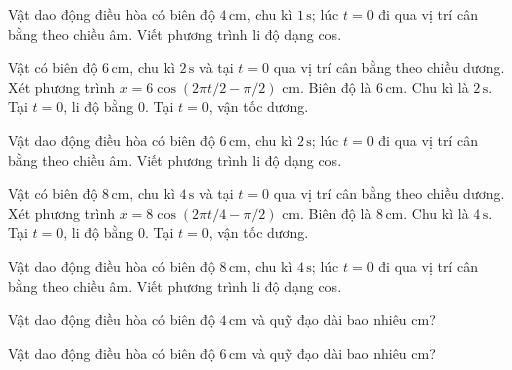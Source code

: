 \begin{bt}
Vật dao động điều hòa có biên độ $4\,\text{cm}$, chu kì $1\,\text{s}$; lúc $t=0$ đi qua vị trí cân bằng theo chiều âm. Viết phương trình li độ dạng cos.
\end{bt}

\begin{ex}
Vật có biên độ $6\,\text{cm}$, chu kì $2\,\text{s}$ và tại $t=0$ qua vị trí cân bằng theo chiều dương. Xét phương trình $x=6\cos(2\pi t/2-\pi/2)$ cm.
\choiceTF
{\True Biên độ là $6\,\text{cm}$.}
{\True Chu kì là $2\,\text{s}$.}
{\True Tại $t=0$, li độ bằng 0.}
{\True Tại $t=0$, vận tốc dương.}
\end{ex}

\begin{bt}
Vật dao động điều hòa có biên độ $6\,\text{cm}$, chu kì $2\,\text{s}$; lúc $t=0$ đi qua vị trí cân bằng theo chiều âm. Viết phương trình li độ dạng cos.
\end{bt}

\begin{ex}
Vật có biên độ $8\,\text{cm}$, chu kì $4\,\text{s}$ và tại $t=0$ qua vị trí cân bằng theo chiều dương. Xét phương trình $x=8\cos(2\pi t/4-\pi/2)$ cm.
\choiceTF
{\True Biên độ là $8\,\text{cm}$.}
{\True Chu kì là $4\,\text{s}$.}
{\True Tại $t=0$, li độ bằng 0.}
{\True Tại $t=0$, vận tốc dương.}
\end{ex}

\begin{bt}
Vật dao động điều hòa có biên độ $8\,\text{cm}$, chu kì $4\,\text{s}$; lúc $t=0$ đi qua vị trí cân bằng theo chiều âm. Viết phương trình li độ dạng cos.
\end{bt}

\begin{ex}
Vật dao động điều hòa có biên độ $4\,\text{cm}$ và quỹ đạo dài bao nhiêu cm?
\end{ex}

\begin{ex}
Vật dao động điều hòa có biên độ $6\,\text{cm}$ và quỹ đạo dài bao nhiêu cm?
\end{ex}

